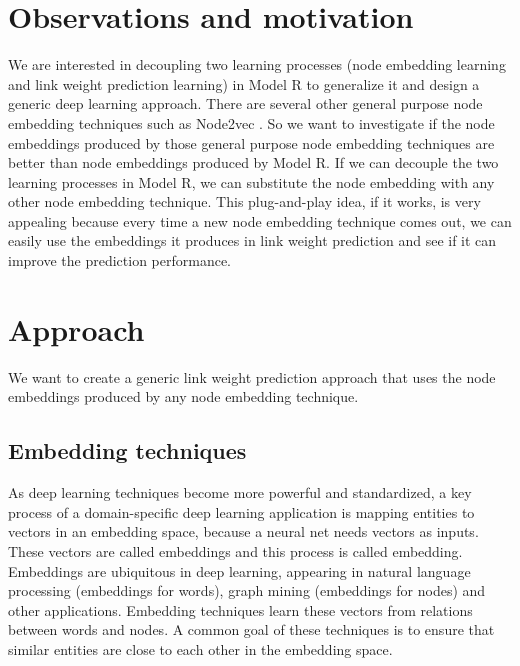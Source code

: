 \documentclass[12pt]{WSUThesis}
\theoremstyle{definition}
\begin{document}
\section{Observations and motivation}
We are interested in decoupling two learning processes (node embedding learning and link weight prediction learning) in Model R to generalize it and design a generic deep learning approach.
There are several other general purpose node embedding techniques such as Node2vec \citep{grover2016node2vec}.
So we want to investigate if the node embeddings produced by those general purpose node embedding techniques are better than node embeddings produced by Model R.
If we can decouple the two learning processes in Model R, we can substitute the node embedding with any other node embedding technique.
This plug-and-play idea, if it works, is very appealing because every time a new node embedding technique comes out, we can easily use the embeddings it produces in link weight prediction and see if it can improve the prediction performance.

\section{Approach}
We want to create a generic link weight prediction approach that uses the node embeddings produced by any node embedding technique.

\subsection{Embedding techniques}
As deep learning techniques become more powerful and standardized,
a key process of a domain-specific deep learning application
is mapping entities to vectors in an embedding space,
because a neural net needs vectors as inputs.
These vectors are called embeddings and this process is called embedding.
Embeddings are ubiquitous in deep learning,
appearing in natural language processing (embeddings for words),
graph mining (embeddings for nodes) and other applications.
Embedding techniques learn these vectors from relations between words and nodes.
A common goal of these techniques is to ensure that
similar entities are close to each other in the embedding space.
\end{document}

